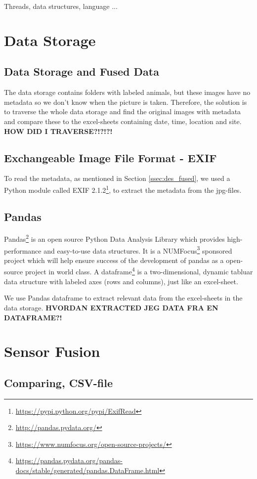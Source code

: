 \documentclass[USenglish]{uit-thesis}
\begin{document}
Threads, data structures, language ...

\section{Data Storage} \label{ssec:imp_storage}
\subsection{Data Storage and Fused Data} \label{ssec:storage_fused}
The data storage contains folders with labeled animals, but these images have no metadata so we don't know when the picture is taken. Therefore, the solution is to traverse the whole data storage and find the original images with metadata and compare these to the excel-sheets containing date, time, location and site.
\textbf{HOW DID I TRAVERSE?!?!?!}

\subsection{Exchangeable Image File Format - EXIF}
To read the metadata, as mentioned in Section \ref{ssec:des_fused}, we used a Python module called  EXIF 2.1.2\footnote{\url{https://pypi.python.org/pypi/ExifRead}}, to extract the metadata from the jpg-files.

\subsection{Pandas}
Pandas\footnote{\url{http://pandas.pydata.org/}} is an open source Python Data Analysis Library which provides high-performance and easy-to-use data structures. It is a NUMFocus\footnote{\url{https://www.numfocus.org/open-source-projects/}} sponsored project which will help ensure success of the development of pandas as a open-source project in world class. A dataframe\footnote{\url{https://pandas.pydata.org/pandas-docs/stable/generated/pandas.DataFrame.html}} is a two-dimensional, dynamic tabluar data structure with labeled axes (rows and columns), just like an excel-sheet.

We use Pandas dataframe to extract relevant data from the excel-sheets in the data storage. \textbf{HVORDAN EXTRACTED JEG DATA FRA EN DATAFRAME?!}


\section{Sensor Fusion} \label{ssec:imp_senfus}
\subsection{Comparing, CSV-file}
\end{document}
